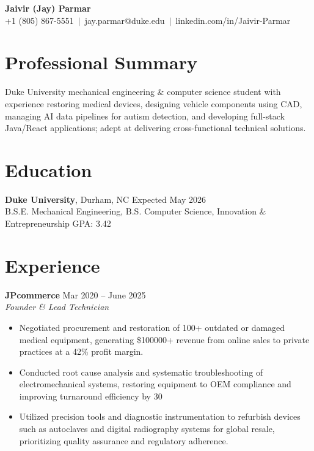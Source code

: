 \documentclass[11pt]{article}
\begin{document}
\begin{center}
    {\LARGE \textbf{Jaivir (Jay) Parmar}}\\[0.2cm]
    +1 (805) 867-5551 \,$\vert$\, jay.parmar@duke.edu \,$\vert$\, linkedin.com/in/Jaivir-Parmar
\end{center}

\section*{Professional Summary}
Duke University mechanical engineering \& computer science student with experience restoring medical devices,  designing vehicle components using CAD, managing AI data pipelines for autism detection, and developing full-stack Java/React applications; adept at delivering cross-functional technical solutions.

\section*{Education}
\textbf{Duke University}, Durham, NC \hfill Expected May 2026\\
B.S.E. Mechanical Engineering, B.S. Computer Science, Innovation \& Entrepreneurship \hfill GPA: 3.42

\section*{Experience}

\textbf{JPcommerce} \hfill Mar 2020 -- June 2025\\
\textit{Founder \& Lead Technician}
\begin{itemize}
    \item Negotiated procurement and restoration of 100+ outdated or damaged medical equipment, generating \$100000+ revenue from online sales to private practices at a 42\% profit margin.
    \item Conducted root cause analysis and systematic troubleshooting of electromechanical systems, restoring equipment to OEM compliance and improving turnaround efficiency by 30%
    \item Utilized precision tools and diagnostic instrumentation to refurbish devices such as autoclaves and digital radiography systems for global resale, prioritizing quality assurance and regulatory adherence.
    
\end{itemize}
\end{document}
